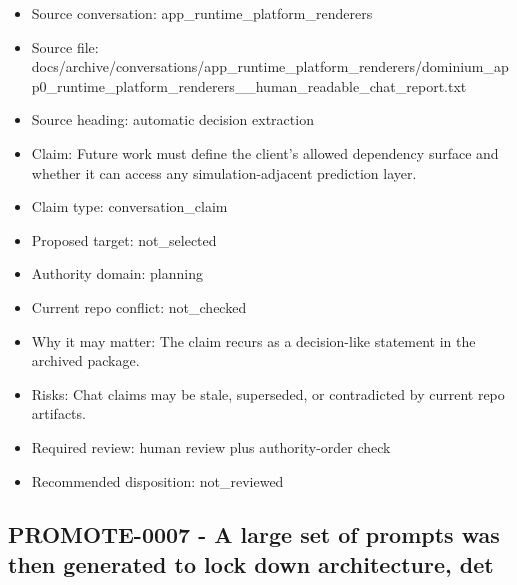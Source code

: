 \documentclass[11pt,a4paper]{report}
\begin{document}
\begin{itemize}
\item Source conversation: app\_runtime\_platform\_renderers
\item Source file: docs/archive/conversations/app\_runtime\_platform\_renderers/dominium\_app0\_runtime\_platform\_renderers\_\_human\_readable\_chat\_report.txt
\item Source heading: automatic decision extraction
\item Claim: Future work must define the client's allowed dependency surface and whether it can access any simulation-adjacent prediction layer.
\item Claim type: conversation\_claim
\item Proposed target: not\_selected
\item Authority domain: planning
\item Current repo conflict: not\_checked
\item Why it may matter: The claim recurs as a decision-like statement in the archived package.
\item Risks: Chat claims may be stale, superseded, or contradicted by current repo artifacts.
\item Required review: human review plus authority-order check
\item Recommended disposition: not\_reviewed
\end{itemize}

\subsection{PROMOTE-0007 - A large set of prompts was then generated to lock down architecture, det}
\end{document}
